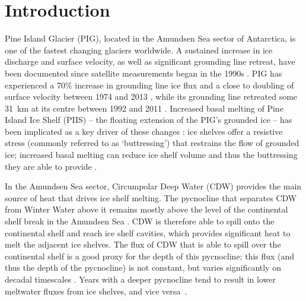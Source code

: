 \documentclass[draft]{agujournal2019}
\begin{document}
\section{Introduction}\label{S:Introduction}
Pine Island Glacier (PIG), located in the Amundsen Sea sector of Antarctica, is one of the fastest changing glaciers worldwide. A sustained increase in ice discharge and surface velocity, as well as significant grounding line retreat, have been documented since satellite measurements began in the 1990s \cite{Rignot2002AnnGlac, Rignot2008GRL, Rignot2011Science, Mouginot2014GRL, Gardner2018Cryo}. PIG has experienced a 70\% increase in grounding line ice flux and a close to doubling of surface velocity between 1974 and 2013 \cite{Mouginot2014GRL}, while its grounding line retreated some 31~km at its centre between 1992 and 2011 \cite{Rignot2014GRL}. Increased basal melting of Pine Island Ice Shelf (PIIS) -- the floating extension of the PIG's grounded ice -- has been implicated as a key driver of these changes \cite{Shepherd2004GRL, Pritchard2012Nature, Rignot2019PNAS}: ice shelves offer a resistive stress (commonly referred to as `buttressing') that restrains the flow of grounded ice; increased basal melting can reduce ice shelf volume and thus the buttressing they are able to provide \cite{Gudmundsson2013Cryo, Reese2018NatureClimCh, Gudmundsson2019GRL,Gagliardini2010GRL,Goldberg2019GRL, DeRydt2021Cryosphere}.

In the Amundsen Sea sector, Circumpolar Deep Water (CDW) provides the main source of heat that drives ice shelf melting. The pycnocline that separates CDW from Winter Water above it remains mostly above the level of the continental shelf break in the Amundsen Sea \cite{Jacobs2015Oceanography, Heywood2016Oceanography}. CDW is therefore able to spill onto the continental shelf and reach ice shelf cavities, which provides significant heat to melt the adjacent ice shelves. The flux of CDW that is able to spill over the continental shelf is a good proxy for the depth of this pycnocline; this flux (and thus the depth of the pycnocline) is not constant, but varies significantly on decadal timescales \cite{Jenkins2018NatureGeo}. Years with a deeper pycnocline tend to result in lower meltwater fluxes from ice shelves, and vice versa~\cite{Jacobs2011NatureGeosci,Dutrieux2014Science}.
\end{document}
